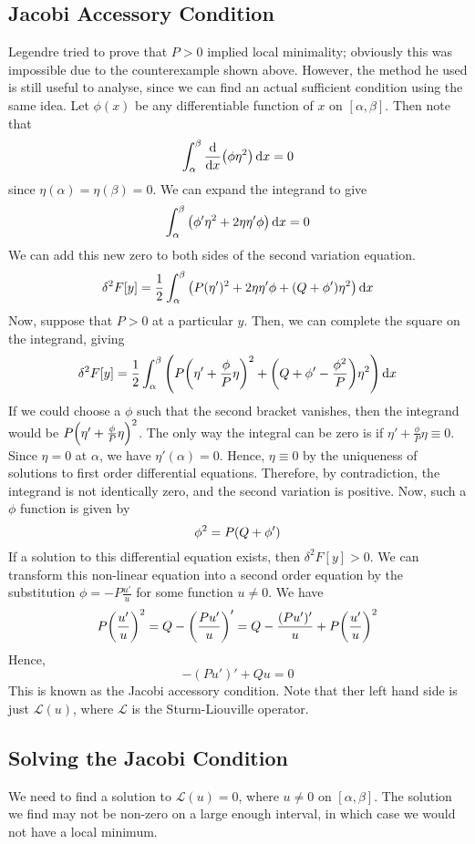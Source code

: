 \subsection{Jacobi Accessory Condition}
Legendre tried to prove that \( P > 0 \) implied local minimality; obviously this was impossible due to the counterexample shown above.
However, the method he used is still useful to analyse, since we can find an actual sufficient condition using the same idea.
Let \( \phi(x) \) be any differentiable function of \( x \) on \( [\alpha, \beta] \).
Then note that
\[ \int_\alpha^\beta \dv{x} \qty( \phi \eta^2 ) \dd{x} = 0 \]
since \( \eta(\alpha) = \eta(\beta) = 0 \).
We can expand the integrand to give
\[ \int_\alpha^\beta \qty( \phi' \eta^2 + 2 \eta \eta' \phi ) \dd{x} = 0 \]
We can add this new zero to both sides of the second variation equation.
\[ \delta^2 F[y] = \frac{1}{2} \int_\alpha^\beta \qty( P(\eta')^2 + 2 \eta \eta' \phi + \qty(Q + \phi') \eta^2 ) \dd{x} \]
Now, suppose that \( P > 0 \) at a particular \( y \).
Then, we can complete the square on the integrand, giving
\[ \delta^2 F[y] = \frac{1}{2} \int_\alpha^\beta \qty( P\qty(\eta' + \frac{\phi}{P} \eta)^2 + \qty(Q + \phi' - \frac{\phi^2}{P}) \eta^2 ) \dd{x} \]
If we could choose a \( \phi \) such that the second bracket vanishes, then the integrand would be \( P\qty(\eta' + \frac{\phi}{P} \eta)^2 \).
The only way the integral can be zero is if \( \eta' + \frac{\phi}{P} \eta \equiv 0 \). Since \( \eta = 0 \) at \( \alpha \), we have \( \eta'(\alpha) = 0 \).
Hence, \( \eta \equiv 0 \) by the uniqueness of solutions to first order differential equations.
Therefore, by contradiction, the integrand is not identically zero, and the second variation is positive.
Now, such a \( \phi \) function is given by
\[ \phi^2 = P\qty(Q + \phi') \]
If a solution to this differential equation exists, then \( \delta^2 F[y] > 0 \).
We can transform this non-linear equation into a second order equation by the substitution \( \phi = -P \frac{u'}{u} \) for some function \( u \neq 0 \).
We have
\[ P \qty(\frac{u'}{u})^2 = Q - \qty(\frac{Pu'}{u})' = Q - \frac{(Pu')'}{u} + P \qty(\frac{u'}{u})^2 \]
Hence,
\[ -(Pu')' + Qu = 0 \]
This is known as the Jacobi accessory condition.
Note that ther left hand side is just \( \mathcal L(u) \), where \( \mathcal L \) is the Sturm-Liouville operator.

\subsection{Solving the Jacobi Condition}
We need to find a solution to \( \mathcal L(u) = 0 \), where \( u \neq 0 \) on \( [\alpha, \beta] \).
The solution we find may not be non-zero on a large enough interval, in which case we would not have a local minimum.

